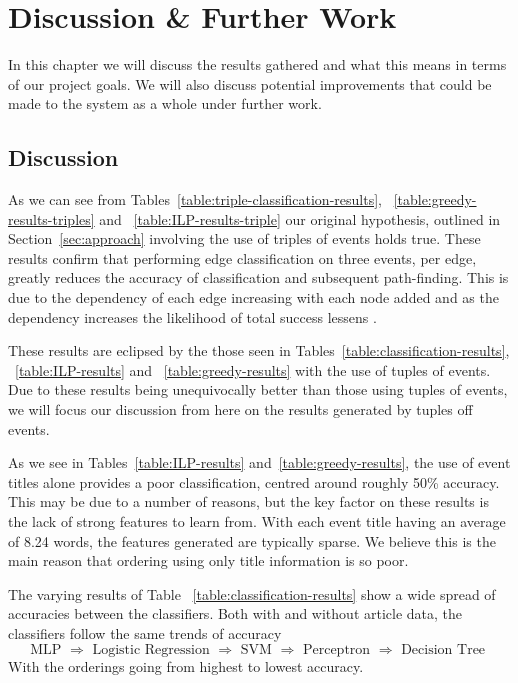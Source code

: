 \documentclass[bsc,frontabs,twoside,singlespacing,parskip,deptreport]{infthesis}     %
\begin{document}
\chapter{Discussion \& Further Work}\label{chapter:discussion}
In this chapter we will discuss the results gathered and what this means in terms of our project goals.
We will also discuss potential improvements that could be made to the system as a whole under further work.
\section{Discussion}
As we can see from Tables~\ref{table:triple-classification-results}, ~\ref{table:greedy-results-triples} and
~\ref{table:ILP-results-triple} our original hypothesis, outlined in Section~\ref{sec:approach}
involving the use of triples of events holds true.
These results confirm that performing edge classification on three events, per edge, greatly reduces the
accuracy of classification and subsequent path-finding. This is due to the dependency of each edge
increasing with each node added and as the dependency increases the likelihood of total success lessens \cite{gerdes2013computational}.

These results are eclipsed by the those seen in Tables~\ref{table:classification-results}, ~\ref{table:ILP-results} and ~\ref{table:greedy-results} with the use of tuples of events.
Due to these results being unequivocally better than those using tuples of events, we will focus our discussion from here on
the results generated by tuples off events.

As we see in  Tables~\ref{table:ILP-results} and~\ref{table:greedy-results}, the use of event titles alone
provides a poor classification, centred around roughly 50\% accuracy. This may be due to a number of reasons,
but the key factor on these results is the lack of strong features to learn from. With each event title having an average of
8.24 words, the features generated are typically  sparse. We believe this is the main reason that ordering using
only title information is so poor.

The varying results of Table ~\ref{table:classification-results} show a wide spread of accuracies between the classifiers.
Both with and without article data, the classifiers follow the same trends of accuracy
\begin{equation}
\text{MLP $\Rightarrow$ Logistic Regression $\Rightarrow$ SVM $\Rightarrow$ Perceptron $\Rightarrow$ Decision Tree }\nonumber  
\end{equation}
With the orderings going from highest to lowest accuracy.
\end{document}
